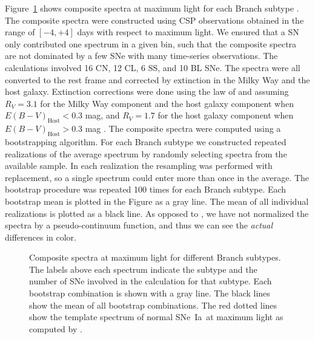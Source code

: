 \documentclass[apj]{emulateapj-rtx4}
\newcommand{\sneia}{SNe~Ia}
\begin{document}
Figure~\ref{fig:spave} shows composite spectra at maximum light for
each Branch subtype \citep[cf. Figure~11 of][]{blondin12}. The
  composite spectra were constructed using CSP observations obtained
in the range of $[-4,+4]$ days with respect to maximum
light. We ensured that a SN only contributed one spectrum in a given
bin, such that the composite spectra are not dominated by a few SNe
with many time-series observations. The calculations involved 16 CN,
12 CL, 6 SS, and 10 BL SNe. The spectra were all converted to
the rest frame and corrected by extinction in the Milky Way and the
host galaxy. Extinction corrections were done using the law of
\citet{cardelli89} and assuming $R_V=3.1$ for the Milky Way component
and the host galaxy component 
when $E(B-V)_{\mathrm{Host}}<0.3$ mag, and $R_V=1.7$ for the host
galaxy component when $E(B-V)_{\mathrm{Host}}>0.3$ mag 
  \citep[see][]{folatelli10,foley11a,mandel11}.  
The composite spectra were computed using a bootstrapping
algorithm. For each Branch subtype we constructed repeated realizations
of the average spectrum by randomly selecting spectra from the available
sample. In each realization the resampling was performed with
replacement, so a single spectrum could enter more than once in the average. 
The bootstrap procedure was repeated 100 times for each Branch
subtype. Each bootstrap mean is plotted in the Figure as a
gray line. The mean of all individual realizations is plotted as a
black line. As opposed to \citet{blondin12}, we have not normalized
the spectra by a pseudo-continuum function, and thus we can see the
{\em actual} differences in color. 

\begin{figure}[htpb]%
\caption{Composite spectra at maximum light for different Branch
  subtypes. The labels above each spectrum indicate the subtype and
  the number of SNe involved in the calculation for that
  subtype. Each bootstrap combination is shown with a gray line. The 
  black lines show the mean of all bootstrap combinations. The red
  dotted lines show the template spectrum of normal \sneia\ at maximum light
  as computed by \citet{hsiao07}.\label{fig:spave}} 
\end{figure}
\end{document}
